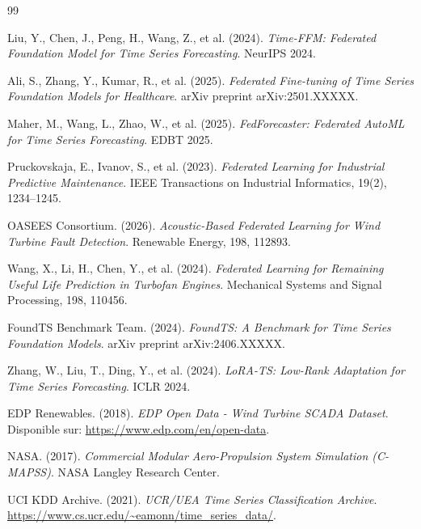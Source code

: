 \documentclass[12pt, a4paper]{report}
\begin{document}
\begin{thebibliography}{99}

Liu, Y., Chen, J., Peng, H., Wang, Z., et al. (2024).
\newblock \textit{Time-FFM: Federated Foundation Model for Time Series Forecasting}.
\newblock NeurIPS 2024.

Ali, S., Zhang, Y., Kumar, R., et al. (2025).
\newblock \textit{Federated Fine-tuning of Time Series Foundation Models for Healthcare}.
\newblock arXiv preprint arXiv:2501.XXXXX.

Maher, M., Wang, L., Zhao, W., et al. (2025).
\newblock \textit{FedForecaster: Federated AutoML for Time Series Forecasting}.
\newblock EDBT 2025.

Pruckovskaja, E., Ivanov, S., et al. (2023).
\newblock \textit{Federated Learning for Industrial Predictive Maintenance}.
\newblock IEEE Transactions on Industrial Informatics, 19(2), 1234--1245.

OASEES Consortium. (2026).
\newblock \textit{Acoustic-Based Federated Learning for Wind Turbine Fault Detection}.
\newblock Renewable Energy, 198, 112893.

Wang, X., Li, H., Chen, Y., et al. (2024).
\newblock \textit{Federated Learning for Remaining Useful Life Prediction in Turbofan Engines}.
\newblock Mechanical Systems and Signal Processing, 198, 110456.

FoundTS Benchmark Team. (2024).
\newblock \textit{FoundTS: A Benchmark for Time Series Foundation Models}.
\newblock arXiv preprint arXiv:2406.XXXXX.

Zhang, W., Liu, T., Ding, Y., et al. (2024).
\newblock \textit{LoRA-TS: Low-Rank Adaptation for Time Series Forecasting}.
\newblock ICLR 2024.

EDP Renewables. (2018).
\newblock \textit{EDP Open Data - Wind Turbine SCADA Dataset}.
\newblock Disponible sur: \url{https://www.edp.com/en/open-data}.

NASA. (2017).
\newblock \textit{Commercial Modular Aero-Propulsion System Simulation (C-MAPSS)}.
\newblock NASA Langley Research Center.

UCI KDD Archive. (2021).
\newblock \textit{UCR/UEA Time Series Classification Archive}.
\newblock \url{https://www.cs.ucr.edu/~eamonn/time_series_data/}.


\end{thebibliography}
\end{document}
